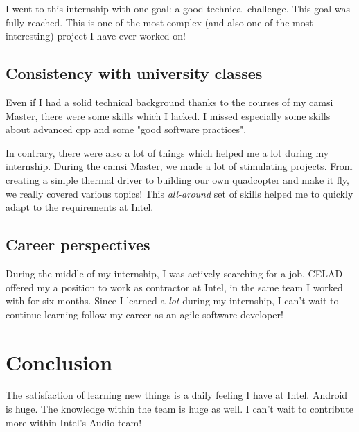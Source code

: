 I went to this internship with one goal: a good technical challenge. This goal
was fully reached. This is one of the most complex (and also one of the most
interesting) project I have ever worked on!

\subsection{Consistency with university classes}
Even if I had a solid technical background thanks to the courses of my
\gls{camsi} Master, there were some skills which I lacked.
I missed especially some skills about advanced \gls{cpp} and some "good software practices".

In contrary, there were also a lot of things which helped me a lot during
my internship.  During the \gls{camsi} Master, we made a lot of stimulating
projects. From creating a simple thermal driver to building our own quadcopter
and make it fly, we really covered various topics! This \emph{all-around} set of
skills helped me to quickly adapt to the requirements at Intel.

\subsection{Career perspectives}
During the middle of my internship, I was actively searching for a job. CELAD offered my a position to work
as contractor at Intel, in the same team I worked with for six months.
Since I learned a \emph{lot} during my internship, I can't wait to continue learning follow my career
as an agile software developer!

\section{Conclusion}
The satisfaction of learning new things is a daily feeling I have at
Intel. Android is huge. The knowledge within the team is huge as well. I can't
wait to contribute more within Intel's Audio team!
